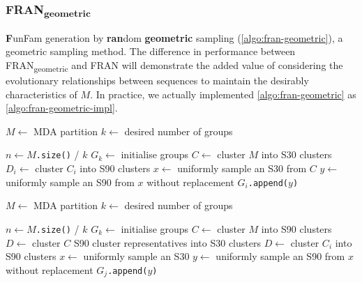 \subsubsection{FRAN\textsubscript{geometric}}

\textbf{F}unFam generation by \textbf{ran}dom \textbf{geometric} sampling (\ref{algo:fran-geometric}), a geometric sampling method. The difference in performance between FRAN\textsubscript{geometric} and FRAN will demonstrate the added value of considering the evolutionary relationships between sequences to maintain the desirably characteristics of $M$. In practice, we actually implemented \ref{algo:fran-geometric} as \ref{algo:fran-geometric-impl}.

\begin{algorithm}[hbt!]
    \caption{%
        FRAN\textsubscript{geometric}.
    }
    \label{algo:fran-geometric}
    \begin{algorithmic}[1]
        \State $M \gets$ MDA partition
        \State $k \gets$ desired number of groups


        \State $n \gets M$\texttt{.size()} / $k$
        \State $G_k \gets$ initialise groups
        \State $C \gets$ cluster $M$ into S30 clusters
            \State $D_i \gets$ cluster $C_i$ into S90 clusters
        \EndFor
                \State $x \gets$ uniformly sample an S30 from $C$
                \State $y \gets$ uniformly sample an S90 from $x$ without replacement
                \State $G_i$\texttt{.append($y$)}
            \EndWhile
        \EndFor
        \EndProcedure
    \end{algorithmic}
\end{algorithm}

\begin{algorithm}[hbt!]
    \caption{%
        FRAN\textsubscript{geometric} implementation.
    }
    \label{algo:fran-geometric-impl}
    \begin{algorithmic}[1]
    \State $M \gets$ MDA partition
    \State $k \gets$ desired number of groups


        \State $n \gets M$\texttt{.size()} / $k$
        \State $G_k \gets$ initialise groups
        \State $C \gets$ cluster $M$ into S90 clusters
        \State $D \gets$ cluster $C$ S90 cluster representatives into S30 clusters
            \State $D \gets$ cluster $C_i$ into S90 clusters
                    \State $x \gets$ uniformly sample an S30
                    \State $y \gets$ uniformly sample an S90 from $x$ without replacement
                    \State $G_j$\texttt{.append($y$)}
                \EndWhile
            \EndFor
        \EndFor
        \EndProcedure
    \end{algorithmic}
\end{algorithm}


